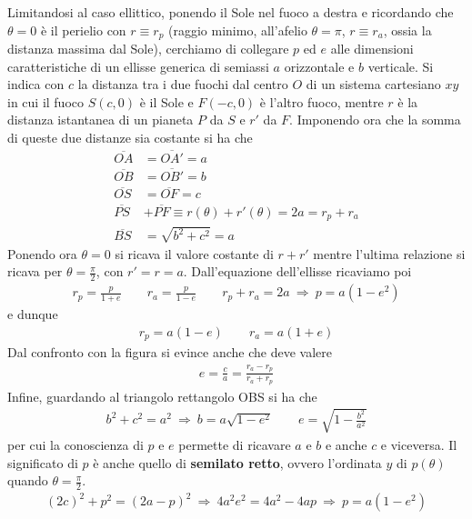\documentclass[a4paper, oneside]{book}
\begin{document}
Limitandosi al caso ellittico, ponendo il Sole nel fuoco 
a destra e ricordando che $\theta = 0$ è il perielio con $r \equiv r_p$
(raggio minimo, all'afelio $\theta = \pi$, $r \equiv r_a$, ossia la 
distanza massima dal Sole), cerchiamo di collegare $p$ ed $e$ alle dimensioni 
caratteristiche di un ellisse generica di semiassi $a$ orizzontale 
e $b$ verticale. Si indica con $c$ la distanza tra i due fuochi dal centro $O$
di un sistema cartesiano $xy$ in cui il fuoco $S(c, 0)$
è il Sole e $F(-c , 0)$ è l'altro fuoco, mentre $r$ è la distanza istantanea 
di un pianeta $P$ da $S$ e $r'$ da $F$. Imponendo ora che la somma di queste due distanze
sia costante si ha che
\begin{align*}
    \overline{OA} &= \overline{OA'} = a \\
    \overline{OB} &= \overline{OB'} = b \\
    \overline{OS} &= \overline{OF} = c \\
    \overline{PS} &+ \overline{PF} \equiv r(\theta) + r'(\theta) = 2a = r_p + r_a \\
    \overline{BS} &= \sqrt{b^{2} + c^{2}} = a          
\end{align*}
Ponendo ora $\theta = 0$ si ricava il valore costante di $r + r'$ mentre 
l'ultima relazione si ricava per $\theta = \frac{\pi}{2}$, con $r' = r = a$. 
Dall'equazione dell'ellisse ricaviamo poi 
\begin{gather*}
    r_p = \frac{p}{1 + e} \qquad r_a = \frac{p}{1 - e} \qquad r_p + r_a = 2a \ \Longrightarrow \ p = a(1 - e^{2})
\end{gather*}
e dunque 
\begin{gather*}
    r_p = a(1 - e) \qquad r_a = a(1 + e)
\end{gather*}
Dal confronto con la figura si evince anche che deve valere
\begin{gather*}
    e = \frac{c}{a} = \frac{r_a - r_p}{r_a + r_p}
\end{gather*}
Infine, guardando al triangolo rettangolo OBS si ha che
\begin{gather*}
    b^{2} + c^{2} = a^{2} \ \Longrightarrow \ b = a\sqrt{1 - e^{2}} \qquad e = \sqrt{1 - \frac{b^{2}}{a^{2}}}  
\end{gather*}
per cui la conoscienza di $p$ e $e$ permette di ricavare $a$ e $b$
e anche $c$ e viceversa. Il significato di $p$ è anche quello di 
\textbf{semilato retto}, ovvero l'ordinata $y$ di $p(\theta)$ quando $\theta = \frac{\pi}{2}$. 
\begin{gather*}
    (2c)^{2} + p^{2} = (2a - p)^{2} \ \Longrightarrow \ 4a^{2}e^{2} = 4a^{2} - 4ap \ \Longrightarrow \ p = a(1 - e^{2})
\end{gather*}
\end{document}
